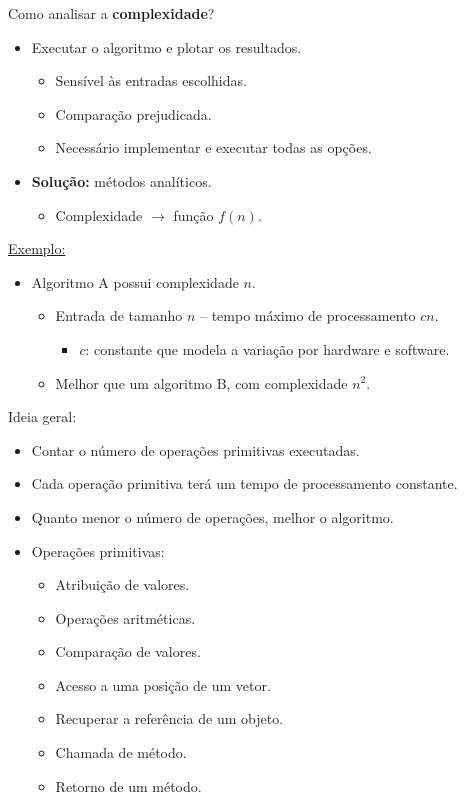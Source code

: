 Como analisar a \textbf{complexidade}?
\begin{itemize}
	\item Executar o algoritmo e plotar os resultados.
	\begin{itemize}
		\item Sensível às entradas escolhidas.
		\item Comparação prejudicada. 
		\item Necessário implementar e executar todas as opções.
	\end{itemize}
	\item \textbf{Solução:} métodos analíticos.
	\begin{itemize}
		\item Complexidade $\to$ função $f(n)$. 
	\end{itemize}
\end{itemize}

\medskip

\underline{Exemplo:}
\begin{itemize}
	\item Algoritmo A possui complexidade $n$.
	\begin{itemize}
		\item Entrada de tamanho $n$ -- tempo máximo de processamento $cn$.
		\begin{itemize}
			\item $c$: constante que modela a variação por hardware e software.
		\end{itemize}
		\item Melhor que um algoritmo B, com complexidade $n^2$.
	\end{itemize}
\end{itemize}



Ideia geral:
\begin{itemize}
	\item Contar o número de operações primitivas executadas.
	\item Cada operação primitiva terá um tempo de processamento constante.
	\item Quanto menor o número de operações, melhor o algoritmo.
	
		\item Operações primitivas:
		\begin{itemize}
			\item Atribuição de valores.
			\item Operações aritméticas.
			\item Comparação de valores.
			\item Acesso a uma posição de um vetor.
			\item Recuperar a referência de um objeto.
			\item Chamada de método.
			\item Retorno de um método.
		\end{itemize}
\end{itemize}

